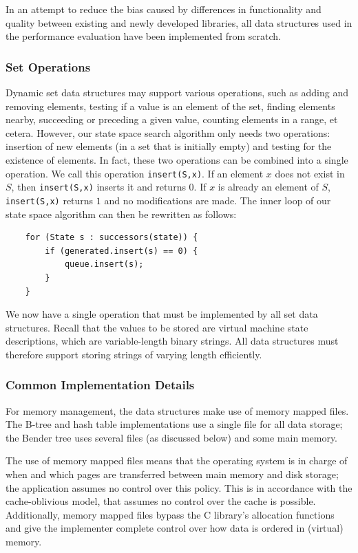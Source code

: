 \documentclass{acm_proc_article-sp}
\begin{document}
In an attempt to reduce the bias caused by differences in functionality and
quality between existing and newly developed libraries, all data structures
used in the performance evaluation have been implemented from scratch.

\subsubsection{Set Operations}
Dynamic set data structures may support various operations, such as adding and removing elements, testing if a value is an element of the set, finding elements nearby, succeeding or preceding a given value, counting elements in a range, et cetera. However, our state space search algorithm only needs two operations: insertion of new elements (in a set that is initially empty) and testing for the existence of elements. In fact, these two operations can be combined into a single operation. We call this operation \verb#insert(S,x)#. If an element $x$ does not exist in $S$, then \verb#insert(S,x)# inserts it and returns $0$. If $x$ is already an element of $S$, \verb#insert(S,x)# returns $1$ and no modifications are made. The inner loop of our state space algorithm can then be rewritten as follows:
\begin{verbatim}
    for (State s : successors(state)) {
        if (generated.insert(s) == 0) {
            queue.insert(s);
        }
    }
\end{verbatim}

We now have a single operation that must be implemented by all set data structures. Recall that the values to be stored are virtual machine state descriptions, which are variable-length binary strings. All data structures must therefore support storing strings of varying length efficiently.

\subsubsection{Common Implementation Details}
For memory management, the data structures make use of memory mapped files.
The B-tree and hash table implementations use a single file for all data storage;
the Bender tree uses several files (as discussed below) and some main memory.

The use of memory mapped files means that the operating system is in charge of
when and which pages are transferred between main memory and disk storage; the
application assumes no control over this policy. This is in accordance with the
cache-oblivious model, that assumes no control over the cache is possible.
Additionally, memory mapped files bypass the C library's allocation functions
and give the implementer complete control over how data is ordered in (virtual)
memory.
\end{document}
